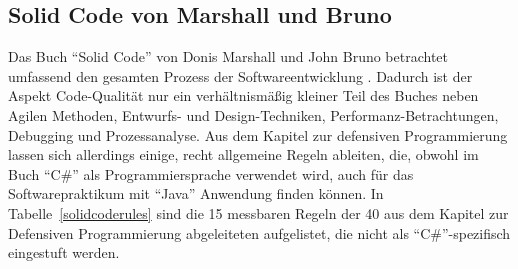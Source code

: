 \documentclass[da,ngerman]{stthesis}
\begin{document}
			\subsection{Solid Code von Marshall und Bruno}
				Das Buch "`Solid Code"' von Donis Marshall und John Bruno betrachtet umfassend den gesamten Prozess der Softwareentwicklung \cite{SolidCode}. \newline
				Dadurch ist der Aspekt Code-Qualität nur ein verhältnismäßig kleiner Teil des Buches neben Agilen Methoden, Entwurfs- und Design-Techniken, Performanz-Betrachtungen, Debugging und Prozessanalyse. Aus dem Kapitel zur defensiven Programmierung lassen sich allerdings einige, recht allgemeine Regeln ableiten, die, obwohl im Buch "`C\#"' als Programmiersprache verwendet wird, auch für das Softwarepraktikum mit "`Java"' Anwendung finden können. In Tabelle~\ref{solidcoderules} sind die 15 messbaren Regeln der 40 aus dem Kapitel zur Defensiven Programmierung abgeleiteten aufgelistet, die nicht als "`C\#"'-spezifisch eingestuft werden.
\end{document}
